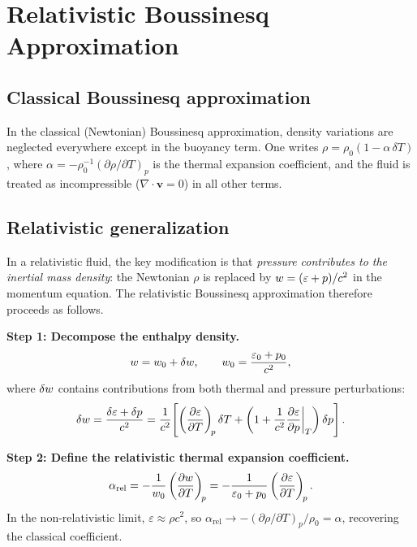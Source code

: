 \section{Relativistic Boussinesq Approximation}
\label{sec:rel-boussinesq}

\subsection{Classical Boussinesq approximation}
\label{sec:classical-boussinesq}

In the classical (Newtonian) Boussinesq approximation, density
variations are neglected everywhere except in the buoyancy term.
One writes $\rho = \rho_0(1 - \alpha\,\delta T)$, where
$\alpha = -\rho_0^{-1}(\partial\rho/\partial T)_p$ is the thermal
expansion coefficient, and the fluid is treated as incompressible
($\nabla\cdot\mathbf{v} = 0$) in all other terms.

\subsection{Relativistic generalization}
\label{sec:rel-boussinesq-gen}

In a relativistic fluid, the key modification is that \emph{pressure
contributes to the inertial mass density}: the Newtonian $\rho$ is
replaced by $w = (\varepsilon + p)/c^2$ in the momentum
equation.  The relativistic Boussinesq approximation therefore
proceeds as follows.

\medskip\noindent
\textbf{Step 1: Decompose the enthalpy density.}
\begin{equation}
  w = w_0 + \delta w,
  \qquad
  w_0 = \frac{\varepsilon_0 + p_0}{c^2},
  \label{eq:rel-bouss-decomp}
\end{equation}
where $\delta w$ contains contributions from both thermal and
pressure perturbations:
\begin{equation}
  \delta w
    = \frac{\delta\varepsilon + \delta p}{c^2}
    = \frac{1}{c^2}\!\left[
      \left(\frac{\partial\varepsilon}{\partial T}\right)_{\!p} \delta T
      + \left(1 + \frac{1}{c^2}\frac{\partial\varepsilon}{\partial p}\bigg|_T\right) \delta p
    \right].
  \label{eq:rel-dw}
\end{equation}

\medskip\noindent
\textbf{Step 2: Define the relativistic thermal expansion coefficient.}
\begin{equation}
  \alpha_{\mathrm{rel}}
    = -\frac{1}{w_0}
      \left(\frac{\partial w}{\partial T}\right)_{\!p}
    = -\frac{1}{\varepsilon_0 + p_0}
      \left(\frac{\partial\varepsilon}{\partial T}\right)_{\!p}.
  \label{eq:rel-alpha}
\end{equation}
In the non-relativistic limit, $\varepsilon \approx \rho c^2$,
so $\alpha_{\mathrm{rel}} \to -(\partial\rho/\partial T)_p / \rho_0
= \alpha$, recovering the classical coefficient.

